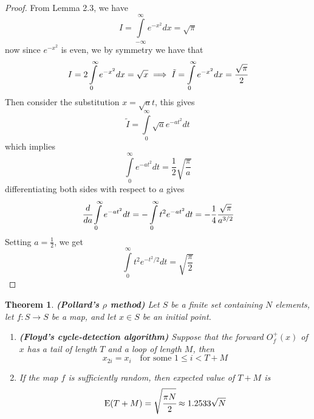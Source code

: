 \documentclass[a4 paper]{article}
\newcommand{\?}{\stackrel{?}{=}}
\newtheorem{theorem}{Theorem}[section]
\begin{document}
\begin{tcolorbox}[breakable,colback=blue!5!white, colframe=blue!50!black]
\begin{proof}
From Lemma 2.3, we have 
$$ I = \int\limits_{- \infty}^{\infty} e^{-x^2} dx = \sqrt{\pi}  $$
now since $ e^{-x^2} $ is even, we by symmetry we have that 
$$ I = 2 \int\limits_{0 }^{\infty}  e^{-x^2} dx =  \sqrt{x} \implies \tilde{I} = \int\limits_{0}^{\infty} e^{-x^2} dx = \cfrac{\sqrt{\pi}}{2}  $$
Then consider the substitution $ x = \sqrt{a} t $, this gives 
$$ \tilde{I} = \int\limits_{0 }^{\infty}  \sqrt{a}  e^{- a t ^2}  d t $$
which implies 
$$ \int\limits_{0}^{\infty} e^{- a t^2} dt = \frac{1}{2} \sqrt{ \frac{\pi}{a}}  $$
differentiating both sides with respect to $ a $ gives 
$$ \cfrac{d }{da } \int\limits_{0}^{\infty} e^{- a t^2} dt = - \int\limits_{0}^{\infty} t^2 e^{-at^2} dt = - \frac{1}{4} \cfrac{\sqrt{\pi}}{a^{3 / 2}}   $$
Setting $ a = \frac{1}{2} $, we get 
$$ \int\limits_{0}^{\infty} t^2 e^{-t^2 / 2} dt = \sqrt{\frac{\pi}{2}} $$

\end{proof}
\end{tcolorbox}

\begin{tcolorbox}
\begin{theorem}
\textbf{(Pollard's $ \rho $ method)} Let $ S $ be a finite set containing $ N $ elements, let $ f : S \to S $ be a map, and let $ x \in S $ be an initial point. 
\begin{enumerate}
    \item \textbf{(Floyd's cycle-detection algorithm)} Suppose that the forward $ O_f^+ (x) $ of $ x $ has a tail of length $ T $ and a loop of length $ M $, then 
    $$ x_{2i} = x_i \quad \text{for some } 1 \leq i < T+ M $$
    \item If the map $ f $ is sufficiently random, then expected value of $ T + M $ is  
    $$ \text{E}(T+M)  = \sqrt{\cfrac{\pi N }{ 2} }\approx 1.2533 \sqrt{N} $$
\end{enumerate}


\end{theorem}
\end{tcolorbox}
\end{document}
